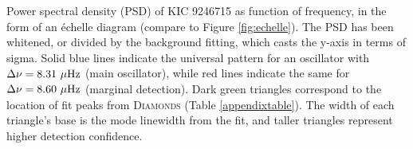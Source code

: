 \label{fig:appendixfig}
Power spectral density (PSD) of KIC 9246715 as function of frequency, in the form of an \'echelle diagram (compare to Figure \ref{fig:echelle}). The PSD has been whitened, or divided by the background fitting, which casts the y-axis in terms of sigma. Solid blue lines indicate the universal pattern for an oscillator with $\Delta \nu = 8.31 \ \mu \rm{Hz}$ (main oscillator), while red lines indicate the same for $\Delta \nu = 8.60 \ \mu \rm{Hz}$ (marginal detection). Dark green triangles correspond to the location of fit peaks from \textsc{D\large{iamonds}} (Table \ref{appendixtable}). The width of each triangle's base is the mode linewidth from the fit, and taller triangles represent higher detection confidence.
